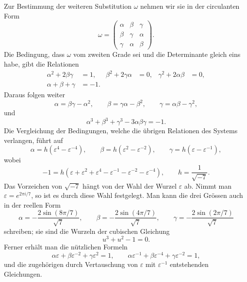 \documentclass[11pt]{article}
\newcommand{\eps}{\varepsilon}
\newcommand{\mat}[1]{\begin{pmatrix}#1\end{pmatrix}}
\begin{document}
Zur Bestimmung der weiteren Substitution \(\omega\) nehmen wir sie in der circulanten Form
\begin{equation}
\omega=\mat{\alpha&\beta&\gamma\\\beta&\gamma&\alpha\\\gamma&\alpha&\beta}.
\tag{3}
\end{equation}
Die Bedingung, dass \(\omega\) vom zweiten Grade sei und die Determinante gleich eins habe, gibt die Relationen
\begin{align}
\alpha^2+2\beta\gamma&=1,&
\beta^2+2\gamma\alpha&=0,&
\gamma^2+2\alpha\beta&=0,\tag{4}\\
\alpha+\beta+\gamma&=-1.\tag{5}
\end{align}
Daraus folgen weiter
\begin{equation}
\alpha=\beta\gamma-\alpha^2,
\qquad
\beta=\gamma\alpha-\beta^2,
\qquad
\gamma=\alpha\beta-\gamma^2,
\tag{6}
\end{equation}
und
\begin{equation}
\alpha^3+\beta^3+\gamma^3-3\alpha\beta\gamma=-1.
\tag{7}
\end{equation}
Die Vergleichung der Bedingungen, welche die übrigen Relationen des Systems verlangen, führt auf
\begin{equation}
\alpha=h(\eps^4-\eps^{-4}),\qquad
\beta=h(\eps^2-\eps^{-2}),\qquad
\gamma=h(\eps-\eps^{-1}),
\tag{8}
\end{equation}
wobei
\begin{equation}
-1=h(\eps+\eps^2+\eps^4-\eps^{-1}-\eps^{-2}-\eps^{-4}),
\qquad h=\frac1{\sqrt{-7}}.
\tag{9}
\end{equation}
Das Vorzeichen von \(\sqrt{-7}\) hängt von der Wahl der Wurzel \(\eps\) ab. Nimmt man \(\eps=e^{2\pi i/7}\), so ist es durch diese Wahl festgelegt. Man kann die drei Grössen auch in der reellen Form
\begin{equation}
\alpha=-\frac{2\sin(8\pi/7)}{\sqrt7},
\qquad
\beta=-\frac{2\sin(4\pi/7)}{\sqrt7},
\qquad
\gamma=-\frac{2\sin(2\pi/7)}{\sqrt7}
\tag{10}
\end{equation}
schreiben; sie sind die Wurzeln der cubischen Gleichung
\begin{equation}
u^3+u^2-1=0.
\tag{11}
\end{equation}
Ferner erhält man die nützlichen Formeln
\begin{equation}
\alpha\eps+\beta\eps^{-2}+\gamma\eps^{2}=1,
\qquad
\alpha\eps^{-1}+\beta\eps^{-4}+\gamma\eps^{-2}=1,
\tag{12}
\end{equation}
und die zugehörigen durch Vertauschung von \(\eps\) mit \(\eps^{-1}\) entstehenden Gleichungen.
\end{document}
